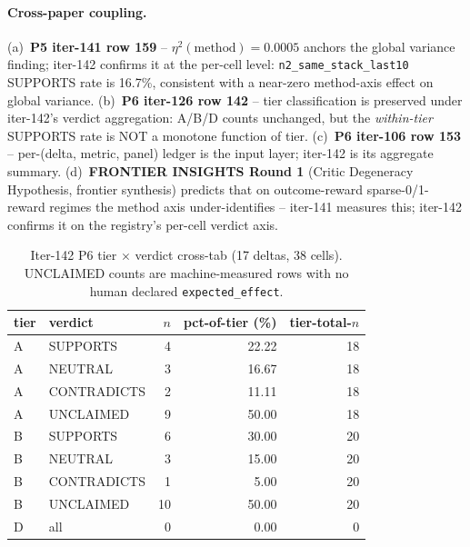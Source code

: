 \paragraph{Cross-paper coupling.}
(a)~\textbf{P5 iter-141 row 159} -- $\eta^2(\text{method}) = 0.0005$
anchors the global variance finding; iter-142 confirms it at the
per-cell level: \texttt{n2\_same\_stack\_last10} SUPPORTS rate is 16.7\%,
consistent with a near-zero method-axis effect on global variance.
(b)~\textbf{P6 iter-126 row 142} -- tier classification is preserved
under iter-142's verdict aggregation: A/B/D counts unchanged, but the
\emph{within-tier} SUPPORTS rate is NOT a monotone function of tier.
(c)~\textbf{P6 iter-106 row 153} -- per-(delta, metric, panel) ledger is
the input layer; iter-142 is its aggregate summary.  (d)~\textbf{FRONTIER
INSIGHTS Round 1} (Critic Degeneracy Hypothesis, frontier synthesis)
predicts that on outcome-reward sparse-0/1-reward regimes the method
axis under-identifies -- iter-141 measures this; iter-142 confirms it on
the registry's per-cell verdict axis.

\begin{table}[t]
\centering
\small
\caption{Iter-142 P6 tier $\times$ verdict cross-tab (17 deltas, 38 cells).
UNCLAIMED counts are machine-measured rows with no human declared
\texttt{expected\_effect}.}
\label{tab:p6-iter142-tier-x-verdict}
\begin{tabular}{llrrr}
\toprule
tier & verdict & $n$ & pct-of-tier (\%) & tier-total-$n$ \\
\midrule
A & SUPPORTS    & 4 & 22.22 & 18 \\
A & NEUTRAL     & 3 & 16.67 & 18 \\
A & CONTRADICTS & 2 & 11.11 & 18 \\
A & UNCLAIMED   & 9 & 50.00 & 18 \\
\midrule
B & SUPPORTS    & 6 & 30.00 & 20 \\
B & NEUTRAL     & 3 & 15.00 & 20 \\
B & CONTRADICTS & 1 &  5.00 & 20 \\
B & UNCLAIMED   &10 & 50.00 & 20 \\
\midrule
D & all         & 0 &  0.00 &  0 \\
\bottomrule
\end{tabular}
\end{table}


